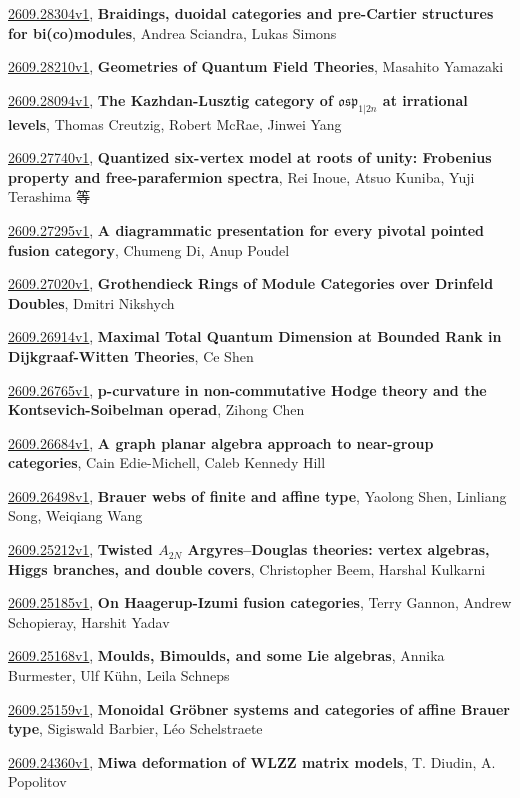 \documentclass[9pt, a4paper]{article}
\theoremstyle{plain}
\theoremstyle{definition}
\theoremstyle{remark}
\newcommand{\arxiv}[3]{\href{https://arxiv.org/abs/#1}{#1}, \textbf{\textcolor{arxivblue}{#2}}, #3}
\begin{document}
\arxiv{2609.28304v1}{Braidings, duoidal categories and pre-Cartier structures for bi(co)modules}{Andrea Sciandra, Lukas Simons}

\arxiv{2609.28210v1}{Geometries of Quantum Field Theories}{Masahito Yamazaki}

\arxiv{2609.28094v1}{The Kazhdan-Lusztig category of $\mathfrak{osp}_{1|2n}$ at irrational levels}{Thomas Creutzig, Robert McRae, Jinwei Yang}

\arxiv{2609.27740v1}{Quantized six-vertex model at roots of unity: Frobenius property and free-parafermion spectra}{Rei Inoue, Atsuo Kuniba, Yuji Terashima 等}

\arxiv{2609.27295v1}{A diagrammatic presentation for every pivotal pointed fusion category}{Chumeng Di, Anup Poudel}

\arxiv{2609.27020v1}{Grothendieck Rings of Module Categories over Drinfeld Doubles}{Dmitri Nikshych}

\arxiv{2609.26914v1}{Maximal Total Quantum Dimension at Bounded Rank in Dijkgraaf-Witten Theories}{Ce Shen}

\arxiv{2609.26765v1}{p-curvature in non-commutative Hodge theory and the Kontsevich-Soibelman operad}{Zihong Chen}

\arxiv{2609.26684v1}{A graph planar algebra approach to near-group categories}{Cain Edie-Michell, Caleb Kennedy Hill}

\arxiv{2609.26498v1}{Brauer webs of finite and affine type}{Yaolong Shen, Linliang Song, Weiqiang Wang}

\arxiv{2609.25212v1}{Twisted \texorpdfstring{$A_{2N}$}{A(2N)} Argyres--Douglas theories: vertex algebras, Higgs branches, and double covers}{Christopher Beem, Harshal Kulkarni}

\arxiv{2609.25185v1}{On Haagerup-Izumi fusion categories}{Terry Gannon, Andrew Schopieray, Harshit Yadav}

\arxiv{2609.25168v1}{Moulds, Bimoulds, and some Lie algebras}{Annika Burmester, Ulf Kühn, Leila Schneps}

\arxiv{2609.25159v1}{Monoidal Gröbner systems and categories of affine Brauer type}{Sigiswald Barbier, Léo Schelstraete}

\arxiv{2609.24360v1}{Miwa deformation of WLZZ matrix models}{T. Diudin, A. Popolitov}

\end{document}
